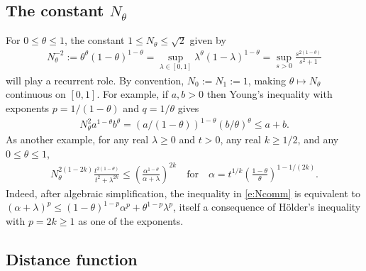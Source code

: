 \documentclass[10pt, a4paper]{iopart}
\theoremstyle{remark}
\theoremstyle{definition}
\begin{document}
\subsection{The constant \texorpdfstring{$N_\theta$}{Nnu}}

For $0 \leq \theta \leq 1$, 
the constant $1 \leq N_\theta \leq \sqrt{2}$ given by
\begin{align}
\label{e:N=sup}
	N_{\theta}^{-2}
	:=
	\theta^\theta (1-\theta)^{1-\theta}
	=
	\sup_{\lambda \in [0, 1]}
	\lambda^\theta (1 - \lambda)^{1 - \theta}
	=
	\sup_{s > 0}
	\frac{s^{2(1 - \theta)}}{s^2 + 1}
\end{align}
will play a recurrent role.
%
By convention, $N_0 := N_1 := 1$,
making $\theta \mapsto N_\theta$ continuous on $[0, 1]$.
%
For example,
if
$a, b > 0$
then
Young's inequality with exponents $p = 1/(1-\theta)$ and $q = 1 / \theta$
gives
\begin{align}
\label{e:Nab}
	N_{\theta}^2
	a^{1-\theta} b^{\theta} 
	=
	(a / (1-\theta))^{1-\theta} (b / \theta)^{\theta}
	\leq
	a + b
	.
\end{align}
%
As another example,
for any real $\lambda \geq 0$ and $t > 0$,
any real $k \geq 1/2$, and any $0 \leq \theta \leq 1$,
\begin{align}
\label{e:Ncomm}
	N_\theta^{2 (1 - 2 k)} 
	\frac{t^{2 (1 - \theta)}}{t^2 + \lambda^{2 k}}
	\leq
	\left(
		\frac{\alpha^{1 - \theta}}{\alpha + \lambda}
	\right)^{2k}
	\quad\text{for}\quad
	\alpha 
	=
	t^{1/k} \left( \frac{1 - \theta}{\theta} \right)^{1 - 1/(2k)}
	.
\end{align}
%
Indeed, after algebraic simplification, 
the inequality in
\eqref{e:Ncomm}
is equivalent to
$
	(\alpha + \lambda)^p
	\leq
	(1-\theta)^{1-p} \alpha^p + \theta^{1-p} \lambda^p
$,
itself a consequence of H\"older's inequality
with $p = 2k \geq 1$ as one of the exponents.



\subsection{Distance function}
\label{s:i:dr}
\end{document}
